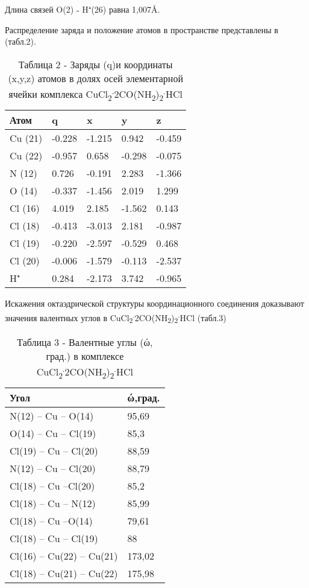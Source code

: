 Длина связей O(2) ˗ H⁺(26) равна 1,007Å.

Распределение заряда и положение атомов в пространстве представлены в
(табл.2).

\begin{table}[H]
\caption*{Таблица 2 - Заряды (q)и координаты (x,y,z) атомов в долях осей элементарной ячейки комплекса CuCl\textsubscript{2}\textsuperscript{.}2CO(NH\textsubscript{2})\textsubscript{2}\textsuperscript{.}HCl}
\centering
\begin{tabular}{|l|l|l|l|l|}
\hline
Атом & q & x & y & z \\ \hline
Cu (21) & -0.228 & -1.215 & 0.942 & -0.459 \\ \hline
Cu (22) & -0.957 & 0.658 & -0.298 & -0.075 \\ \hline
N (12) & 0.726 & -0.191 & 2.283 & -1.366 \\ \hline
O (14) & -0.337 & -1.456 & 2.019 & 1.299 \\ \hline
Cl (16) & 4.019 & 2.185 & -1.562 & 0.143 \\ \hline
Cl (18) & -0.413 & -3.013 & 2.181 & -0.987 \\ \hline
Cl (19) & -0.220 & -2.597 & -0.529 & 0.468 \\ \hline
Cl (20) & -0.006 & -1.579 & -0.113 & -2.537 \\ \hline
H⁺ & 0.284 & -2.173 & 3.742 & -0.965 \\ \hline
\end{tabular}
\end{table}

Искажения октаэдрической структуры координационного соединения
доказывают значения валентных углов в
CuCl\textsubscript{2}\textsuperscript{.}2CO(NH\textsubscript{2})\textsubscript{2}\textsuperscript{.}HCl
(табл.3)

\begin{table}[H]
\caption*{Таблица 3 - Валентные углы (ώ, град.) в комплексе CuCl\textsubscript{2}\textsuperscript{.}2CO(NH\textsubscript{2})\textsubscript{2}\textsuperscript{.}HCl}
\centering
\begin{tabular}{|l|l|}
\hline
Угол & ώ,град. \\ \hline
N(12) – Cu – O(14) & 95,69 \\ \hline
O(14) – Cu – Cl(19) & 85,3 \\ \hline
Cl(19) – Cu – Cl(20) & 88,59 \\ \hline
N(12) – Cu – Cl(20) & 88,79 \\ \hline
Cl(18) – Cu –Cl(20) & 85,2 \\ \hline
Cl(18) – Cu – N(12) & 85,99 \\ \hline
Cl(18) – Cu –O(14) & 79,61 \\ \hline
Cl(18) – Cu – Cl(19) & 88 \\ \hline
Cl(16) – Cu(22) – Cu(21) & 173,02 \\ \hline
Cl(18) – Cu(21) – Cu(22) & 175,98 \\ \hline
\end{tabular}
\end{table}

